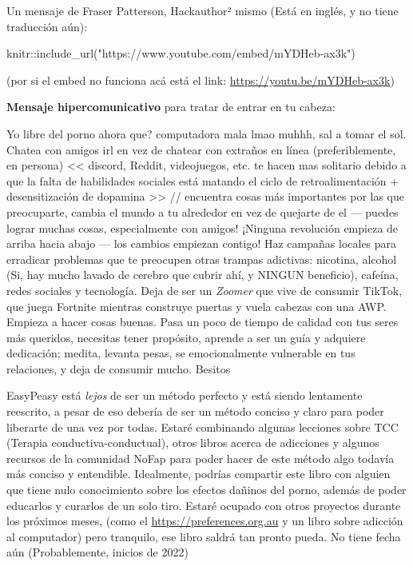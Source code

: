 \documentclass[
]{book}
\newenvironment{Shaded}{\begin{snugshade}}{\end{snugshade}}
\newcommand{\FunctionTok}[1]{\textcolor[rgb]{0.00,0.00,0.00}{#1}}
\newcommand{\NormalTok}[1]{#1}
\newcommand{\SpecialCharTok}[1]{\textcolor[rgb]{0.00,0.00,0.00}{#1}}
\newcommand{\StringTok}[1]{\textcolor[rgb]{0.31,0.60,0.02}{#1}}
\begin{document}
Un mensaje de Fraser Patterson, Hackauthor² mismo (Está en inglés, y no tiene traducción aún):

\begin{Shaded}
\begin{Highlighting}[]
\NormalTok{knitr}\SpecialCharTok{::}\FunctionTok{include\_url}\NormalTok{(}\StringTok{"https://www.youtube.com/embed/mYDHeb{-}ax3k"}\NormalTok{)}
\end{Highlighting}
\end{Shaded}

(por si el embed no funciona acá está el link: \url{https://youtu.be/mYDHeb-ax3k})

\textbf{Mensaje hipercomunicativo} para tratar de entrar en tu cabeza:

Yo libre del porno ahora que? \textbar\textbar\textbar{} computadora mala lmao muhhh, sal a tomar el sol. Chatea con amigos irl en vez de chatear con extraños en línea (preferiblemente, en persona) \textless\textless{} discord, Reddit, videojuegos, etc. te hacen mas solitario debido a que la falta de habilidades sociales está matando el ciclo de retroalimentación + desensitización de dopamina \textgreater\textgreater{} // encuentra cosas más importantes por las que preocuparte, cambia el mundo a tu alrededor en vez de quejarte de el --- puedes lograr muchas cosas, especialmente con amigos! ¡Ninguna revolución empieza de arriba hacia abajo --- los cambios empiezan contigo! Haz campañas locales para erradicar problemas que te preocupen \textbar\textbar{} otras trampas adictivas: nicotina, alcohol (Si, hay mucho lavado de cerebro que cubrir ahí, y NINGUN beneficio), cafeína, redes sociales y tecnología. Deja de ser un \emph{Zoomer} que vive de consumir TikTok, que juega Fortnite mientras construye puertas y vuela cabezas con una AWP. Empieza a hacer cosas buenas. Pasa un poco de tiempo de calidad con tus seres más queridos, necesitas tener propósito, aprende a ser un guía y adquiere dedicación; medita, levanta pesas, se emocionalmente vulnerable en tus relaciones, y deja de consumir mucho. Besitos

EasyPeasy está \emph{lejos} de ser un método perfecto y está siendo lentamente reescrito, a pesar de eso debería de ser un método conciso y claro para poder liberarte de una vez por todas. Estaré combinando algunas lecciones sobre TCC (Terapia conductiva-conductual), otros libros acerca de adicciones y algunos recursos de la comunidad NoFap para poder hacer de este método algo todavía más conciso y entendible. Idealmente, podrías compartir este libro con alguien que tiene nulo conocimiento sobre los efectos dañinos del porno, además de poder educarlos y curarlos de un solo tiro. Estaré ocupado con otros proyectos durante los próximos meses, (como el \url{https://preferences.org.au} y un libro sobre adicción al computador) pero tranquilo, ese libro saldrá tan pronto pueda. No tiene fecha aún (Probablemente, inicios de 2022)
\end{document}
